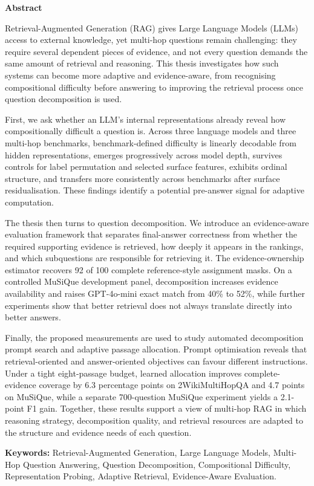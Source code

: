 {}

\begin{center}
\textbf{\Large Abstract}
\end{center}

Retrieval-Augmented Generation (RAG) gives Large Language Models (LLMs) access
to external knowledge, yet multi-hop questions remain challenging: they require
several dependent pieces of evidence, and not every question demands the same
amount of retrieval and reasoning. This thesis investigates how such systems
can become more adaptive and evidence-aware, from recognising compositional
difficulty before answering to improving the retrieval process once question
decomposition is used.

First, we ask whether an LLM's internal representations already reveal how
compositionally difficult a question is. Across three language models and three
multi-hop benchmarks, benchmark-defined difficulty is linearly decodable from
hidden representations, emerges progressively across model depth, survives
controls for label permutation and selected surface features, exhibits ordinal
structure, and transfers more consistently across benchmarks after surface
residualisation. These findings identify a potential pre-answer signal for
adaptive computation.

The thesis then turns to question decomposition. We introduce an evidence-aware
evaluation framework that separates final-answer correctness from whether the
required supporting evidence is retrieved, how deeply it appears in the
rankings, and which subquestions are responsible for retrieving it. The
evidence-ownership estimator recovers 92 of 100 complete reference-style
assignment masks. On a controlled MuSiQue development panel, decomposition
increases evidence availability and raises GPT-4o-mini exact match from 40\% to
52\%, while further experiments show that better retrieval does not always
translate directly into better answers.

Finally, the proposed measurements are used to study automated decomposition
prompt search and adaptive passage allocation. Prompt optimisation reveals that
retrieval-oriented and answer-oriented objectives can favour different
instructions. Under a tight eight-passage budget, learned allocation improves
complete-evidence coverage by 6.3 percentage points on 2WikiMultiHopQA and
4.7 points on MuSiQue, while a separate 700-question MuSiQue experiment yields
a 2.1-point F1 gain. Together, these results support a view of multi-hop RAG in
which reasoning strategy, decomposition quality, and retrieval resources are
adapted to the structure and evidence needs of each question.

\vspace{0.8em}

\noindent\textbf{Keywords:} Retrieval-Augmented Generation, Large Language
Models, Multi-Hop Question Answering, Question Decomposition, Compositional
Difficulty, Representation Probing, Adaptive Retrieval, Evidence-Aware
Evaluation.